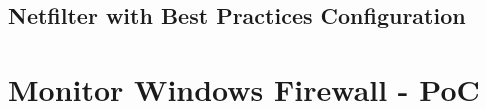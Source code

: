 \documentclass[12pt]{article}
\begin{document}


\subsection{Netfilter with Best Practices Configuration}
\label{appendix:netfilterBestAppendix}



\section{Monitor Windows Firewall - PoC}
\label{appendix:monitorSolution}


\end{document}
